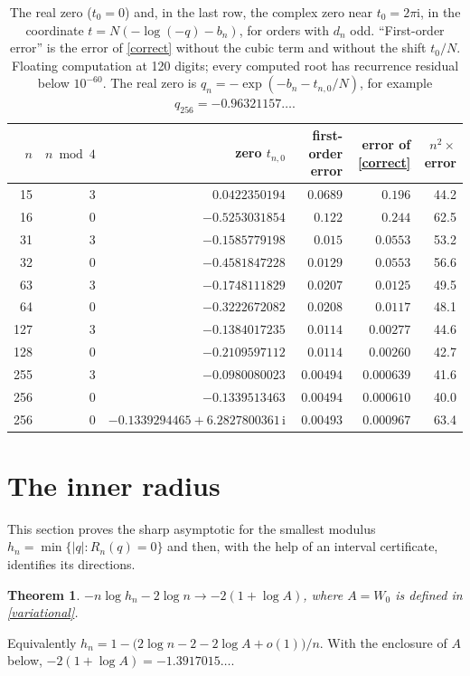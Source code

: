 \documentclass[11pt,a4paper]{article}
\newtheorem{theorem}{Theorem}
\theoremstyle{remark}
\newcommand{\ii}{\mathrm i}
\begin{document}
\begin{table}[ht]
\centering\small
\begin{tabular}{rrrrrr}\toprule
$n$ & $n\bmod4$ & zero $t_{n,0}$ & first-order error & error of \eqref{correct} & $n^2\times$error\\\midrule
15 & 3 & $\phantom{-}0.0422350194$ & $0.0689$ & $0.196$ & 44.2\\
16 & 0 & $-0.5253031854$ & $0.122$ & $0.244$ & 62.5\\
31 & 3 & $-0.1585779198$ & $0.015$ & $0.0553$ & 53.2\\
32 & 0 & $-0.4581847228$ & $0.0129$ & $0.0553$ & 56.6\\
63 & 3 & $-0.1748111829$ & $0.0207$ & $0.0125$ & 49.5\\
64 & 0 & $-0.3222672082$ & $0.0208$ & $0.0117$ & 48.1\\
127 & 3 & $-0.1384017235$ & $0.0114$ & $0.00277$ & 44.6\\
128 & 0 & $-0.2109597112$ & $0.0114$ & $0.00260$ & 42.7\\
255 & 3 & $-0.0980080023$ & $0.00494$ & $0.000639$ & 41.6\\
256 & 0 & $-0.1339513463$ & $0.00494$ & $0.000610$ & 40.0\\
256 & 0 & $-0.1339294465+6.2827800361\,\ii$ & $0.00493$ & $0.000967$ & 63.4\\\bottomrule
\end{tabular}
\caption{The real zero ($t_0=0$) and, in the last row, the complex zero near $t_0=2\pi\ii$, in the coordinate $t=N(-\log(-q)-b_n)$, for orders with $d_n$ odd. ``First-order error'' is the error of \eqref{correct} without the cubic term and without the shift $t_0/N$. Floating computation at 120 digits; every computed root has recurrence residual below $10^{-60}$. The real zero is $q_n=-\exp(-b_n-t_{n,0}/N)$, for example $q_{256}=-0.96321157\ldots$.}\label{tab:finite}
\end{table}

\section{The inner radius}\label{sec:sharp}
This section proves the sharp asymptotic for the smallest modulus $h_n=\min\{|q|:R_n(q)=0\}$ and then, with the help of an interval certificate, identifies its directions.

\begin{theorem}\label{thm:sharp}
$-n\log h_n-2\log n\to-2(1+\log A)$, where $A=W_0$ is defined in \eqref{variational}.
\end{theorem}
Equivalently $h_n=1-\bigl(2\log n-2-2\log A+o(1)\bigr)/n$. With the enclosure of $A$ below, $-2(1+\log A)=-1.3917015\ldots$.
\end{document}
